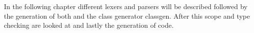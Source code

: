 In the following chapter different lexers and parsers will be described followed by the generation of both and the class generator classgen. After this scope and type checking are looked at and lastly the generation of code.